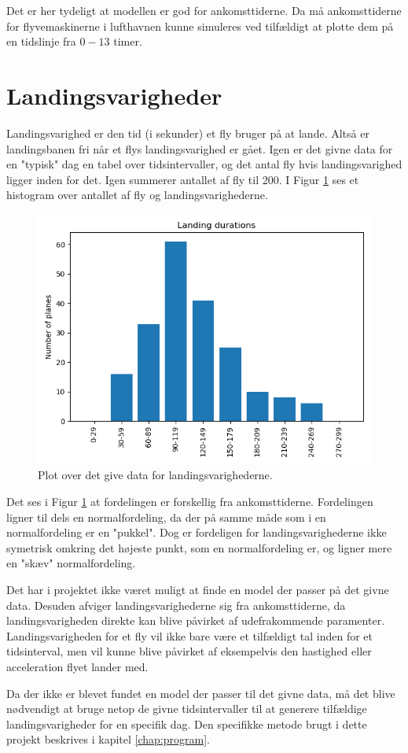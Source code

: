 Det er her tydeligt at modellen er god for ankomsttiderne. Da må ankomsttiderne for flyvemaskinerne i lufthavnen kunne simuleres ved tilfældigt at plotte dem på en tidslinje fra $0 - 13$ timer.

\section{Landingsvarigheder}
Landingsvarighed er den tid (i sekunder) et fly bruger på at lande.
Altså er landingsbanen fri når et flys landingsvarighed er gået.
Igen er det givne data for en "typisk" dag en tabel over tidsintervaller, og det antal fly hvis landingsvarighed ligger inden for det. Igen summerer antallet af fly til 200. I Figur \ref{fig:given_landing_durations_plot} ses et histogram over antallet af fly og landingsvarighederne.

\begin{figure}[h!]
	\centering
	\includegraphics[scale=0.6]{fig/img/given_landing_durations_plot.png}
	\caption{Plot over det give data for landingsvarighederne.} \label{fig:given_landing_durations_plot}
\end{figure}

Det ses i Figur \ref{fig:given_landing_durations_plot} at fordelingen er forskellig fra ankomsttiderne.
Fordelingen ligner til dels en normalfordeling, da der på samme måde som i en normalfordeling er en "pukkel".
Dog er fordeligen for landingsvarighederne ikke symetrisk omkring det højeste punkt, som en normalfordeling er, og ligner mere en "skæv" normalfordeling.

Det har i projektet ikke været muligt at finde en model der passer på det givne data.
Desuden afviger landingsvarighederne sig fra ankomsttiderne, da landingsvarigheden direkte kan blive påvirket af udefrakommende paramenter.
Landingsvarigheden for et fly vil ikke bare være et tilfældigt tal inden for et tidsinterval, men vil kunne blive påvirket af eksempelvis den hastighed eller acceleration flyet lander med. 

Da der ikke er blevet fundet en model der passer til det givne data, må det blive nødvendigt at bruge netop de givne tidsintervaller til at generere tilfældige landingsvarigheder for en specifik dag. Den specifikke metode brugt i dette projekt beskrives i kapitel \ref{chap:program}.
